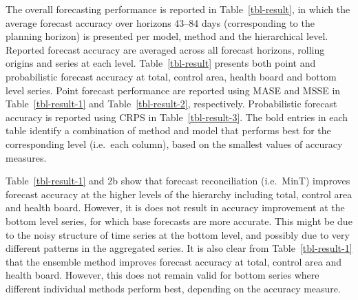 \documentclass[
  authoryear,
  preprint,
  3p]{elsarticle}
\begin{document}
The overall forecasting performance is reported in
Table~\ref{tbl-result}, in which the average forecast accuracy over
horizons 43--84 days (corresponding to the planning horizon) is
presented per model, method and the hierarchical level. Reported
forecast accuracy are averaged across all forecast horizons, rolling
origins and series at each level. Table~\ref{tbl-result} presents both
point and probabilistic forecast accuracy at total, control area, health
board and bottom level series. Point forecast performance are reported
using MASE and MSSE in Table~\ref{tbl-result-1} and
Table~\ref{tbl-result-2}, respectively. Probabilistic forecast accuracy
is reported using CRPS in Table~\ref{tbl-result-3}. The bold entries in
each table identify a combination of method and model that performs best
for the corresponding level (i.e.~each column), based on the smallest
values of accuracy measures.

Table~\ref{tbl-result-1} and 2b show that forecast reconciliation
(i.e.~MinT) improves forecast accuracy at the higher levels of the
hierarchy including total, control area and health board. However, it is
does not result in accuracy improvement at the bottom level series, for
which base forecasts are more accurate. This might be due to the noisy
structure of time series at the bottom level, and possibly due to very
different patterns in the aggregated series. It is also clear from
Table~\ref{tbl-result-1} that the ensemble method improves forecast
accuracy at total, control area and health board. However, this does not
remain valid for bottom series where different individual methods
perform best, depending on the accuracy measure.
\end{document}
